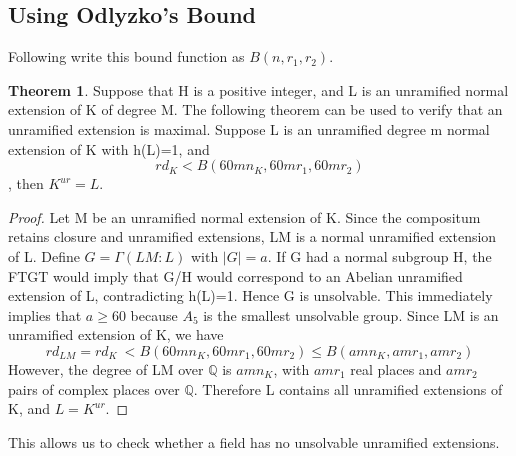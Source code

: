 \documentclass[12pt]{extarticle}
\newcommand{\<}{\langle}
\renewcommand{\>}{\rangle}
\theoremstyle{definition}
\newtheorem{theorem}{Theorem}
\begin{document}
\subsection{Using Odlyzko's Bound}
Following \cite{YAMA1986} write this bound function as $B(n,r_1,r_2)$.
\begin{theorem}
Suppose that H is a positive integer, and L is an unramified normal extension of K of degree M. The following theorem can be used to verify that an unramified extension is maximal. Suppose L is an unramified degree m  normal extension of K with h(L)=1, and 
\begin{equation}
        rd_K<B(60mn_K,60mr_1,60mr_2)
    \end{equation}
, then $K^{ur}=L$.
\end{theorem}
\begin{proof}
Let M be an unramified normal extension of K. Since the compositum retains closure and unramified extensions, LM is a normal unramified extension of L. Define $G=\Gamma(LM:L)$ with $|G|=a$. If G had a normal subgroup H, the FTGT would imply that G/H would correspond to an Abelian unramified extension of L, contradicting h(L)=1. Hence G is unsolvable. This immediately implies that $a\geqslant 60$ because $A_5$ is the 
smallest unsolvable group. Since LM is an unramified extension of K, we have \begin{equation}
    rd_{LM}=rd_{K}\ < B(60mn_K,60mr_1,60mr_2)\leq  B(amn_K,amr_1,amr_2)
\end{equation} 
However, the degree of LM over $\mathbb{Q}$ is $amn_K$, with $amr_1$ real places and $amr_2$ pairs of complex places over $\mathbb{Q}$. Therefore L contains all unramified extensions of K, and $L=K^{ur}$.
\end{proof}
This allows us to check whether a field has no unsolvable unramified extensions. 
\end{document}
